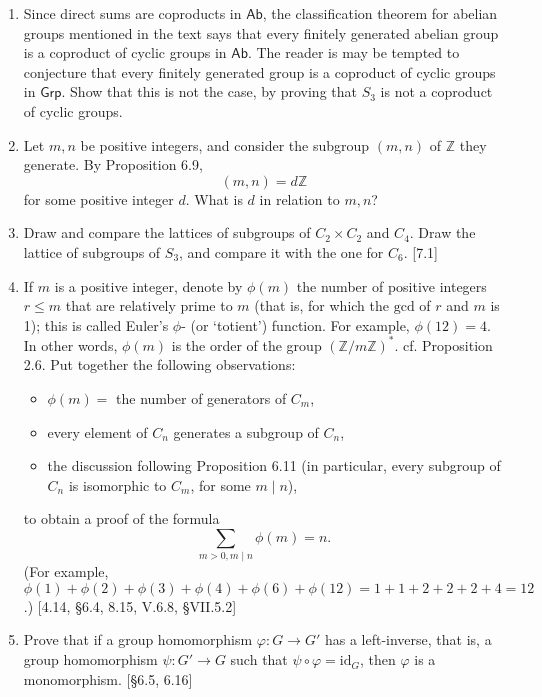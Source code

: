 \begin{enumerate}
    \item Since direct sums are coproducts in $\mathsf{Ab}$, the classification theorem for abelian groups mentioned in the text says that every finitely generated abelian group is a coproduct of cyclic groups in $\mathsf{Ab}$. The reader is may be tempted to conjecture that every finitely generated group is a coproduct of cyclic groups in $\mathsf{Grp}$. Show that this is not the case, by proving that $S_3$ is not a coproduct of cyclic groups.

    \item Let $m, n$ be positive integers, and consider the subgroup $(m, n)$ of $\mathbb{Z}$ they generate. By Proposition 6.9,
          \[ (m, n) = d\mathbb{Z} \]
          for some positive integer $d$. What is $d$ in relation to $m, n$?

    \item Draw and compare the lattices of subgroups of $C_2 \times C_2$ and $C_4$. Draw the lattice of subgroups of $S_3$, and compare it with the one for $C_6$. [7.1]

    \item If $m$ is a positive integer, denote by $\phi(m)$ the number of positive integers $r \le m$ that are relatively prime to $m$ (that is, for which the $\text{gcd}$ of $r$ and $m$ is 1); this is called Euler's $\phi$- (or `totient') function. For example, $\phi(12)=4$. In other words, $\phi(m)$ is the order of the group $(\mathbb{Z}/m\mathbb{Z})^*$. cf. Proposition 2.6.
          Put together the following observations:
          \begin{itemize}
              \item $\phi(m) = $ the number of generators of $C_m$,
              \item every element of $C_n$ generates a subgroup of $C_n$,
              \item the discussion following Proposition 6.11 (in particular, every subgroup of $C_n$ is isomorphic to $C_m$, for some $m \mid n$),
          \end{itemize}
          to obtain a proof of the formula
          \[ \sum_{m>0, m \mid n} \phi(m) = n. \]
          (For example, $\phi(1)+\phi(2)+\phi(3)+\phi(4)+\phi(6)+\phi(12) = 1+1+2+2+2+4 = 12$.) [4.14, \S6.4, 8.15, V.6.8, \S VII.5.2]

    \item Prove that if a group homomorphism $\varphi: G \to G'$ has a left-inverse, that is, a group homomorphism $\psi: G' \to G$ such that $\psi \circ \varphi = \text{id}_G$, then $\varphi$ is a monomorphism. [\S6.5, 6.16]


\end{enumerate}
